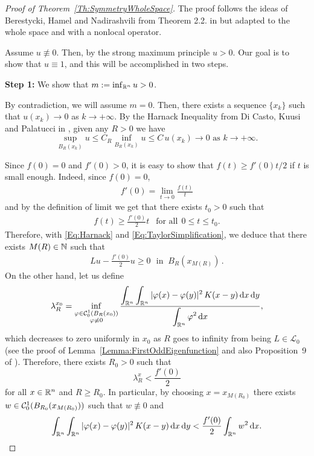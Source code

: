 \begin{proof}[Proof of Theorem~\ref{Th:SymmetryWholeSpace}]
The proof follows the ideas of Berestycki, Hamel and Nadirashvili from Theorem 2.2. in \cite{BerestyckiHamelNadi} but adapted to the whole space and with a nonlocal operator.

Assume $u\not\equiv 0$. Then, by the strong maximum principle $u>0$. Our goal is to show that $u \equiv 1$, and this will be accomplished in two steps.

\textbf{Step 1:} We show that $m:=\inf_{\mathbb{R}^n} u >0$.

By contradiction, we will assume $m=0$. Then, there exists a sequence $\{x_k\}$ such that $u(x_k)\rightarrow 0$ as $k \rightarrow +\infty$. By the Harnack Inequality  from Di Casto, Kuusi and Palatucci in \cite{DiCastoKuusiPalatucci}, given any $R>0$ we have
\begin{equation}
\label{Eq:Harnack}
\sup_{B_R(x_k)}u \leq C_R \inf_{B_R(x_k)}u \leq C \, u(x_k) \rightarrow 0 \,\,\text{as}\,\, k\rightarrow +\infty.
\end{equation}


Since $f(0) = 0 $ and $f'(0)>0$, it is easy to show that $f(t)\geq f'(0)t/2$ if $t$ is small enough. Indeed, since $f(0)=0$,
\begin{align*}
f'(0) = \lim_{t\to 0} \frac{f(t)}{t}
\end{align*}
and by the definition of limit we get that there exists $t_0>0$ such that
\begin{align}
\label{Eq:TaylorSimplification}
f(t)\geq \frac{f'(0)}{2}t \ \ \textrm{ for all} \ \ 0\leq t\leq t_0.
\end{align}
Therefore, with \eqref{Eq:Harnack} and \eqref{Eq:TaylorSimplification}, we deduce that there exists $M(R)\in\mathbb{N}$ such that
\begin{align}
\label{Eq:WholeSpace2}
L u - \frac{f'(0)}{2}u \geq 0 \,\,\textrm{ in }\ B_R(x_{M(R)})\,. 
\end{align}
On the other hand, let us define
$$ \lambda_R^{x_0} = \inf_{\substack{\varphi\in\mathcal{C}^{1}_{0}(B_R(x_0))\\ \varphi\not\equiv 0}} \frac{\displaystyle \int_{\mathbb{R}^n}\int_{\mathbb{R}^n}|\varphi(x)-\varphi(y)|^2\,K(x-y) \,\mathrm{d} x \,\mathrm{d} y}{\displaystyle \int_{\mathbb{R}^n}\varphi^2 \,\mathrm{d} x}, $$
which decreases to zero uniformly in $x_0$ as $R$ goes to infinity from being $L\in\mathcal{L}_0$ (see the proof of Lemma~\ref{Lemma:FirstOddEigenfunction} and also Proposition~9 of \cite{ServadeiValdinoci}). Therefore, there exists $R_0>0$ such that
$$ \lambda_R^x < \frac{f'(0)}{2} $$
for all $x\in \mathbb{R}^n$ and $R\geq R_0$. In particular, by choosing $x=x_{M(R_0)}$ there exists $w\in\mathcal{C}^{1}_0(B_{R_0}(x_{M(R_0)}))$ such that $w\not\equiv 0$ and
\begin{equation}
\label{Eq:Eigenfunction}
\int_{\mathbb{R}^n}\int_{\mathbb{R}^n}|\varphi(x)-\varphi(y)|^2\,K(x-y) \,\mathrm{d} x \,\mathrm{d} y < \frac{f'(0)}{2}\int_{\mathbb{R}^n}w^2 \,\mathrm{d} x.
\end{equation}


\end{proof}
